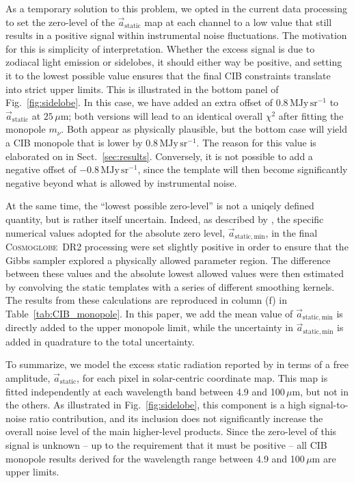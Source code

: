 \documentclass{aa}
\renewcommand{\a}[0]{\vec{a}}
\newcommand{\cosmoglobe}{\textsc{Cosmoglobe}}
\begin{document}
As a temporary solution to this problem, we opted in the
current data processing to set the zero-level of the
$\a_{\mathrm{static}}$ map at each channel to a low value that still
results in a positive signal within instrumental noise
fluctuations. The motivation for this is simplicity of
interpretation. Whether the excess signal is due to zodiacal light
emission or sidelobes, it should either way be positive, and setting
it to the lowest possible value ensures that the final CIB constraints
translate into strict upper limits. This is illustrated in the bottom
panel of Fig.~\ref{fig:sidelobe}. In this case, we have added an extra
offset of 0.8\,$\mathrm{MJy\,sr^{-1}}$ to $\a_{\mathrm{static}}$ at
$25\,\mu\mathrm{m}$; both versions will lead to an identical overall
$\chi^2$ after fitting the monopole $m_{\nu}$.  Both appear as
physically plausible, but the bottom case will yield a CIB monopole
that is lower by 0.8\,$\mathrm{MJy\,sr^{-1}}$. The reason for this
value is elaborated on in Sect.~\ref{sec:results}. Conversely, it
is not possible to add a negative offset of $-0.8$\,$\mathrm{MJy\,sr^{-1}}$, since the
template will then become significantly negative beyond what is
allowed by instrumental noise.

At the same time, the ``lowest possible zero-level'' is not a uniqely
defined quantity, but is rather itself uncertain. Indeed,
as described by \citet{CG02_01}, the specific numerical values adopted
for the absolute zero level, $\a_{\mathrm{static,min}}$, in the final
\cosmoglobe\ DR2 processing were set slightly positive in order to
ensure that the Gibbs sampler explored a physically allowed parameter
region. The difference between these values and the absolute lowest
allowed values were then estimated by convolving the static templates
with a series of different smoothing kernels. The results from these
calculations are reproduced in column (f) in
Table~\ref{tab:CIB_monopole}. In this paper, we add the mean value of
$\a_{\mathrm{static,min}}$ is directly added to the upper monopole
limit, while the uncertainty in $\a_{\mathrm{static,min}}$ is added in
quadrature to the total uncertainty.

To summarize, we model the excess static radiation reported by \citet{CG02_01} in
terms of a free amplitude, $\a_{\mathrm{static}}$, for each pixel in
solar-centric coordinate map. This map is fitted independently at each
wavelength band between 4.9 and 100$\,\mu\mathrm{m}$, but not in the
others. As illustrated in Fig.~\ref{fig:sidelobe}, this component
is a high signal-to-noise ratio contribution, and its
inclusion does not significantly increase the overall noise level of
the main higher-level products. Since the zero-level of this
signal is unknown -- up to the requirement that it must be positive
-- all CIB monopole results derived for the wavelength range between
4.9 and 100$\,\mu\mathrm{m}$ are upper limits. 
\end{document}
